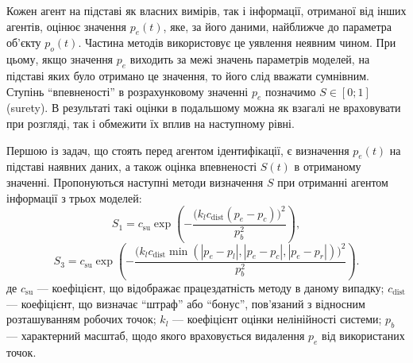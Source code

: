 \documentclass[a4paper,13pt]{atuaref}
\begin{document}
Кожен агент на підставі як власних вимірів, так і інформації, отриманої від
інших агентів, оцінює значення $p_e (t)$, яке, за його даними, найближче до
параметра об'єкту $p_o(t)$.
Частина методів використовує це уявлення неявним чином. При цьому,
якщо значення $p_e$ виходить за межі значень параметрів моделей, на підставі
яких було отримано це значення, то його слід вважати сумнівним.
Ступінь ``впевненості'' в розрахунковому значенні $p_e$ позначимо $S \in [0; 1] $ (surety).
В результаті такі оцінки в подальшому можна як
взагалі не враховувати при розгляді, так і обмежити їх вплив на наступному
рівні.


Першою із задач, що стоять перед агентом ідентифікації, є визначення $p_e(t)$
на підставі наявних даних, а також оцінка впевненості $S(t)$ в
отриманому значенні.
Пропонуються наступні
методи визначення $S$ при отриманні агентом інформації з трьох моделей:
%
\begin{equation}
  S_1 = c_\mathrm{su} \exp \left( - \frac{ \big( k_l c_\mathrm{dist} ( p_e - p_c ) \big)^2 }{p_b^2} \right)
  ,
  \label{atu:eq:S1}
\end{equation}
%
\begin{equation}
  S_3 = c_\mathrm{su} \exp \left( - \frac{ \big( k_l c_\mathrm{dist} \min( |p_e - p_l|,|p_e - p_c|, |p_e - p_r| ) \big)^2 }{p_b^2} \right)
  .
  \label{atu:eq:S3}
\end{equation}
%
де
$c_\mathrm{su}$ ---
коефіцієнт, що відображає працездатність методу в даному випадку;
$c_\mathrm{dist}$ ---
коефіцієнт, що визначає ``штраф'' або ``бонус'', пов'язаний з відносним розташуванням робочих точок;
$k_l$ ---
коефіцієнт оцінки нелінійності системи;
$p_b$
--- характерний масштаб, щодо якого враховується видалення $p_e$ від використаних точок.

\end{document}
